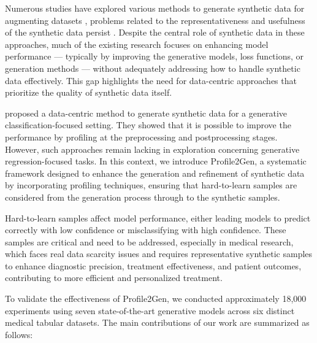 \documentclass{article}
\theoremstyle{plain}
\theoremstyle{definition}
\theoremstyle{remark}
\begin{document}
Numerous studies have explored various methods to generate synthetic data for augmenting datasets \cite{improving}, problems related to the representativeness and usefulness of the synthetic data persist \cite{article}. Despite the central role of synthetic data in these approaches, much of the existing research focuses on enhancing model performance \cite{paper1,paper2,survey} — typically by improving the generative models, loss functions, or generation methods — without adequately addressing how to handle synthetic data effectively. This gap highlights the need for data-centric approaches that prioritize the quality of synthetic data itself.


\citet{hansen2023reimagining} proposed a data-centric method to generate synthetic data for a generative classification-focused setting. They showed that it is possible to improve the performance by profiling at the preprocessing and postprocessing stages. However, such approaches remain lacking in exploration concerning generative regression-focused tasks. In this context, we introduce Profile2Gen, a systematic framework designed to enhance the generation and refinement of synthetic data by incorporating profiling techniques, ensuring that hard-to-learn samples are considered from the generation process through to the synthetic samples.

Hard-to-learn samples affect model performance, either leading models to predict correctly with low confidence or misclassifying with high confidence.
These samples are critical and need to be addressed, especially in medical research, which faces real data scarcity issues and requires representative synthetic samples to enhance diagnostic precision, treatment effectiveness, and patient outcomes, contributing to more efficient and personalized treatment.

To validate the effectiveness of Profile2Gen, we conducted approximately 18,000 experiments using seven state-of-the-art generative models across six distinct medical tabular datasets. The main contributions of our work are summarized as follows:
\end{document}
